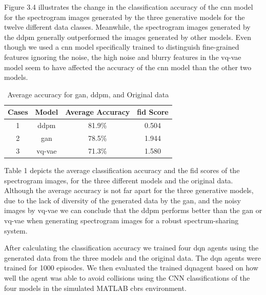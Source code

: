     Figure 3.4 illustrates the change in the classification accuracy of the \gls{cnn} model for the spectrogram images generated by the three generative models for the twelve different data classes. Meanwhile, the spectrogram images generated by the \gls{ddpm} generally outperformed the images generated by other models. Even though we used a \gls{cnn} model specifically trained to distinguish fine-grained features ignoring the noise, the high noise and blurry features in the \gls{vq-vae} model seem to have affected the accuracy of the \gls{cnn} model than the other two models. 
    
    
    \begin{table}[h!]
        \centering
        \begin{tabular}{c c c c}
            \hline
            Cases & Model & Average Accuracy & \gls{fid} Score \\
            \hline
            1 & \gls{ddpm} & 81.9\% & 0.504\\
            \hline
            2 & \gls{gan} & 78.5\% & 1.944\\
            \hline
            3 & \gls{vq-vae} & 71.3\%  & 1.580\\
            \hline
        \end{tabular}
        \caption{Average accuracy for \gls{gan}, \gls{ddpm}, and Original data}
        \label{tab:average_accuracy}
    \end{table}
    
    Table 1 depicts the average classification accuracy and the \gls{fid} scores of the spectrogram images, for the three different models and the original data.
    Although the average accuracy is not far apart for the three generative models, due to the lack of diversity of the generated data by the \gls{gan}, and the noisy images by \gls{vq-vae} we can conclude that the \gls{ddpm} performs better than the \gls{gan} or \gls{vq-vae} when generating spectrogram images for a robust spectrum-sharing system.

    After calculating the classification accuracy we trained four \gls{dqn} agents using the generated data from the three models and the original data. The \gls{dqn} agents were trained for 1000 episodes. We then evaluated the trained \gls{dqn}agent based on how well the agent was able to avoid collisions using the CNN classifications of the four models in the simulated MATLAB \gls{cbrs} environment.

